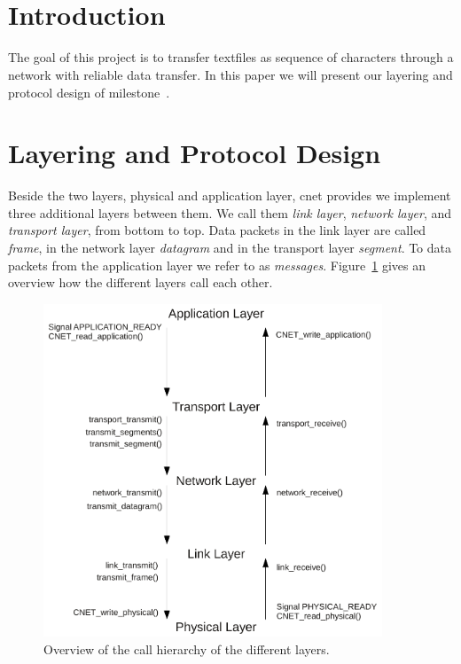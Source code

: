 
\title{\Large \lecture \\ \textbf{\normalsize \assignment}}
\author{\authors}

\setlength \headheight{25pt}
\fancyhead[L]{\authors}

\maketitle

\section{Introduction}
The goal of this project is to transfer textfiles as sequence of characters through a network with reliable data transfer. In this paper we will present our layering and protocol design of milestone~.

\section{Layering and Protocol Design}

Beside the two layers, physical and application layer, cnet provides we implement three additional layers between them. We call them \emph{link layer}, \emph{network layer}, and \emph{transport layer}, from bottom to top. Data packets in the link layer are called \emph{frame}, in the network layer \emph{datagram} and in the transport layer \emph{segment}. To data packets from the application layer we refer to as \emph{messages}. Figure~\ref{fig:overview-layers} gives an overview how the different layers call each other.

\begin{figure}
  \centering
  \includegraphics[width=0.9\textwidth]{images/flowgraph_overview.pdf}
  \caption[Overview Layers]{ Overview of the call hierarchy of the different layers.}
  \label{fig:overview-layers}
\end{figure}


